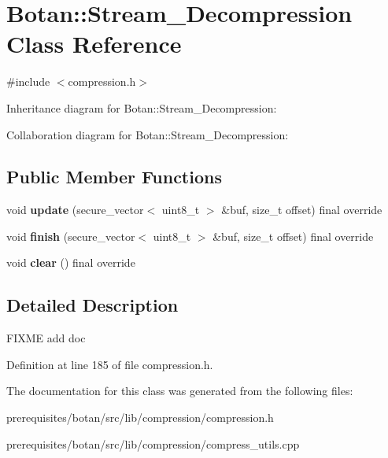 \hypertarget{class_botan_1_1_stream___decompression}{}\section{Botan\+:\+:Stream\+\_\+\+Decompression Class Reference}
\label{class_botan_1_1_stream___decompression}


{\ttfamily \#include $<$compression.\+h$>$}



Inheritance diagram for Botan\+:\+:Stream\+\_\+\+Decompression\+:


Collaboration diagram for Botan\+:\+:Stream\+\_\+\+Decompression\+:
\subsection*{Public Member Functions}
\begin{DoxyCompactItemize}
\item 
\mbox{\label{class_botan_1_1_stream___decompression_ab40ade7752d462516a80304be5feaed9}} 
void {\bfseries update} (secure\+\_\+vector$<$ uint8\+\_\+t $>$ \&buf, size\+\_\+t offset) final override
\item 
\mbox{\label{class_botan_1_1_stream___decompression_a045cadf0cd17c34045f66608a3df16f1}} 
void {\bfseries finish} (secure\+\_\+vector$<$ uint8\+\_\+t $>$ \&buf, size\+\_\+t offset) final override
\item 
\mbox{\label{class_botan_1_1_stream___decompression_a0aa3883a3815fd23d7577a82ec0eaac7}} 
void {\bfseries clear} () final override
\end{DoxyCompactItemize}


\subsection{Detailed Description}
F\+I\+X\+ME add doc 

Definition at line 185 of file compression.\+h.



The documentation for this class was generated from the following files\+:\begin{DoxyCompactItemize}
\item 
prerequisites/botan/src/lib/compression/compression.\+h\item 
prerequisites/botan/src/lib/compression/compress\+\_\+utils.\+cpp\end{DoxyCompactItemize}
